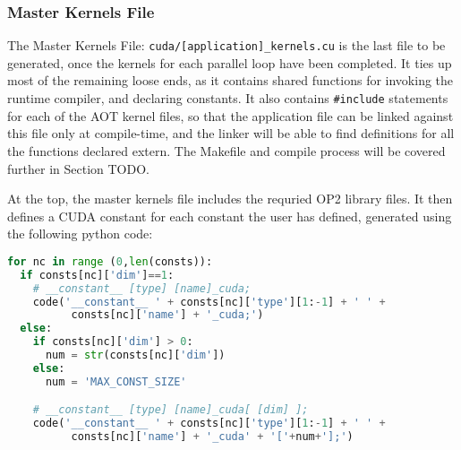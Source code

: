 \subsubsection{Master Kernels File}
\label{sss:mkf}
The Master Kernels File: \verb|cuda/[application]_kernels.cu| is the last file to be generated, once the kernels for each parallel loop have been completed. It ties up most of the remaining loose ends, as it contains shared functions for invoking the runtime compiler, and declaring constants. It also contains \verb|#include| statements for each of the AOT kernel files, so that the application file can be linked against this file only at compile-time, and the linker will be able to find definitions for all the functions declared extern. The Makefile and compile process will be covered further in Section TODO.
\par
At the top, the master kernels file includes the requried OP2 library files. It then defines a CUDA constant for each constant the user has defined, generated using the following python code:
\begin{lstlisting}[backgroundcolor = \color{lightgray!20}, language=Python]
for nc in range (0,len(consts)):
  if consts[nc]['dim']==1:
    # __constant__ [type] [name]_cuda;
    code('__constant__ ' + consts[nc]['type'][1:-1] + ' ' +
          consts[nc]['name'] + '_cuda;')
  else:
    if consts[nc]['dim'] > 0:
      num = str(consts[nc]['dim'])
    else:
      num = 'MAX_CONST_SIZE'

    # __constant__ [type] [name]_cuda[ [dim] ];
    code('__constant__ ' + consts[nc]['type'][1:-1] + ' ' +
          consts[nc]['name'] + '_cuda' + '['+num+'];')
\end{lstlisting}
\vspace{-1em}
